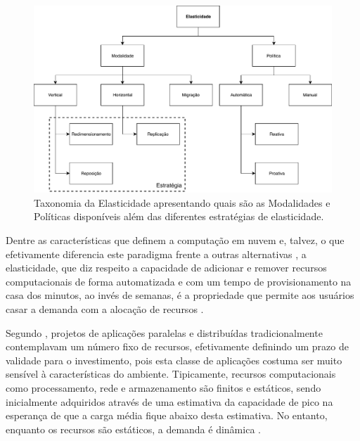 \documentclass[english,brazilian]{UNISINOSmonografia} %
\newcommand\defaultFigureWidth{0.9}
\begin{document}
\begin{figure}[tb]
	\centering%
	\begin{minipage}{\defaultFigureWidth\textwidth}
		\caption{Taxonomia da Elasticidade apresentando quais são as Modalidades e Políticas disponíveis além das diferentes estratégias de elasticidade.}
		\label{fig:elasticidade-taxonomia}
		\vspace{1ex}
		\includegraphics[clip,width=\textwidth]{AUTOELASTIC-taxonomia}
	\end{minipage}
\end{figure}


Dentre as características que definem a computação em nuvem e, talvez, o que efetivamente diferencia este paradigma frente a outras alternativas \cite{Galante2012}, a elasticidade, que diz respeito a capacidade de adicionar e remover recursos computacionais de forma automatizada e com um tempo de provisionamento na casa dos minutos, ao invés de semanas, é a propriedade que permite aos usuários casar a demanda com a alocação de recursos \cite{Armbrust:EECS-2009-28,Raveendran2011,Imai2012,Suleiman2012}.

Segundo , projetos de aplicações paralelas e distribuídas tradicionalmente contemplavam um número fixo de recursos, efetivamente definindo um prazo de validade para o investimento, pois esta classe de aplicações costuma ser muito sensível à características do ambiente. 
Tipicamente, recursos computacionais como processamento, rede e armazenamento são finitos e estáticos, sendo inicialmente adquiridos através de uma estimativa da capacidade de pico na esperança de que a carga média fique abaixo desta estimativa. No entanto, enquanto os recursos são estáticos, a demanda é dinâmica \cite{Marshall2010}.
\end{document}
